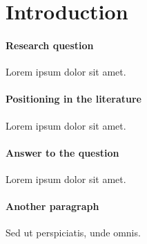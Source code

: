 \documentclass[main.tex]{subfiles}
\begin{document}
\section{Introduction}\label{s:intro}

\paragraph{Research question} Lorem ipsum dolor sit amet. \citet{MS21a}

\paragraph{Positioning in the literature} Lorem ipsum dolor sit amet.

\paragraph{Answer to the question} Lorem ipsum dolor sit amet.

\paragraph{Another paragraph} Sed ut perspiciatis, unde omnis. 
\end{document}
